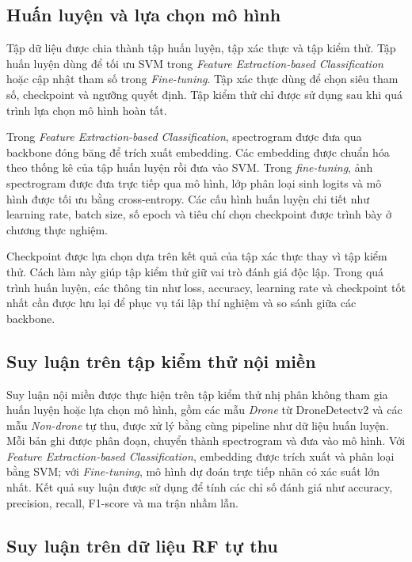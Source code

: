 \documentclass[../DoAn.tex]{subfiles}
\begin{document}
\subsection*{Huấn luyện và lựa chọn mô hình}

Tập dữ liệu được chia thành tập huấn luyện, tập xác thực và tập kiểm thử. Tập huấn luyện dùng để tối ưu SVM trong \textit{Feature Extraction-based Classification} hoặc cập nhật tham số trong \textit{Fine-tuning}. Tập xác thực dùng để chọn siêu tham số, checkpoint và ngưỡng quyết định. Tập kiểm thử chỉ được sử dụng sau khi quá trình lựa chọn mô hình hoàn tất.

Trong \textit{Feature Extraction-based Classification}, spectrogram được đưa qua backbone đóng băng để trích xuất embedding. Các embedding được chuẩn hóa theo thống kê của tập huấn luyện rồi đưa vào SVM. Trong \textit{fine-tuning}, ảnh spectrogram được đưa trực tiếp qua mô hình, lớp phân loại sinh logits và mô hình được tối ưu bằng cross-entropy. Các cấu hình huấn luyện chi tiết như learning rate, batch size, số epoch và tiêu chí chọn checkpoint được trình bày ở chương thực nghiệm.

Checkpoint được lựa chọn dựa trên kết quả của tập xác thực thay vì tập kiểm thử. Cách làm này giúp tập kiểm thử giữ vai trò đánh giá độc lập. Trong quá trình huấn luyện, các thông tin như loss, accuracy, learning rate và checkpoint tốt nhất cần được lưu lại để phục vụ tái lập thí nghiệm và so sánh giữa các backbone.

\subsection*{Suy luận trên tập kiểm thử nội miền}

Suy luận nội miền được thực hiện trên tập kiểm thử nhị phân không tham gia huấn luyện hoặc lựa chọn mô hình, gồm các mẫu \textit{Drone} từ DroneDetectv2 và các mẫu \textit{Non-drone} tự thu, được xử lý bằng cùng pipeline như dữ liệu huấn luyện. Mỗi bản ghi được phân đoạn, chuyển thành spectrogram và đưa vào mô hình. Với \textit{Feature Extraction-based Classification}, embedding được trích xuất và phân loại bằng SVM; với \textit{Fine-tuning}, mô hình dự đoán trực tiếp nhãn có xác suất lớn nhất. Kết quả suy luận được sử dụng để tính các chỉ số đánh giá như accuracy, precision, recall, F1-score và ma trận nhầm lẫn.

\subsection*{Suy luận trên dữ liệu RF tự thu}
\end{document}
